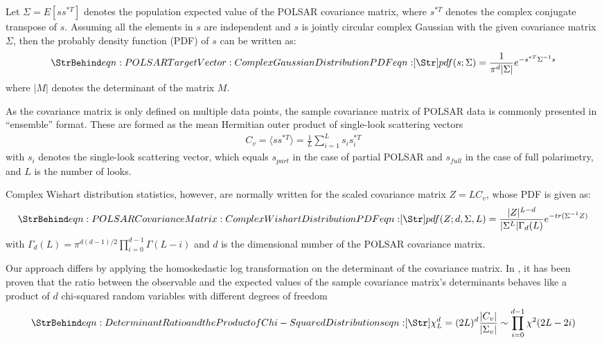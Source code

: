 Let $\Sigma=E [ss^{*T}]$ denotes the population expected value of the POLSAR covariance matrix,
  where $s^{*T}$ denotes the complex conjugate transpose of $s$. 
Assuming all the elements in $s$ are independent
  and $s$ is jointly circular complex Gaussian with the given covariance matrix $\Sigma$,
  then the probably density function (PDF) of $s$ can be written as:
\begin{equation}
  \label{eqn:POLSAR Target Vector: Complex Gaussian Distribution PDF}
  \caption{eqn:POLSAR Target Vector: Complex Gaussian Distribution PDF}
  pdf(s;\Sigma)=\frac{1}{\pi^d|\Sigma|} e^{-s^{*T}\Sigma^{-1}s}
\end{equation}
where $|M|$ denotes the determinant of the matrix $M$.

As the covariance matrix is only defined on multiple data points,
  the sample covariance matrix of POLSAR data is commonly presented in ``ensemble'' format.
These are formed as the mean Hermitian outer product of single-look scattering vectors
\begin{align}
  C_v = \langle ss^{*T} \rangle = \frac{1}{L} \sum^L_{i=1}s_is_i^{*T}
\end{align}
with $s_i$ denotes the single-look scattering vector,
  which equals $s_{part}$ in the case of partial POLSAR and
  $s_{full}$ in the case of full polarimetry,
and $L$ is the number of looks.

Complex Wishart distribution statistics, however, are normally written for the scaled covariance matrix
$Z=LC_v$, whose PDF is given as:
\begin{equation}
  \label{eqn:POLSAR Covariance Matrix: Complex Wishart Distribution PDF}
  \caption{eqn:POLSAR Covariance Matrix: Complex Wishart Distribution PDF}
  pdf(Z;d,\Sigma,L)=\frac{|Z|^{L-d}}{|\Sigma^L|\Gamma_d(L)}e^{-tr(\Sigma^{-1}Z)}
\end{equation}
with $\Gamma_d(L) = \pi^{d(d-1)/2} \prod^{d-1}_{i=0}\Gamma(L-i)$
and $d$ is the dimensional number of the POLSAR covariance matrix.

Our approach differs by applying the homoskedastic log transformation
  on the determinant of the covariance matrix.
In \cite{Goodman_1963_AMS_178}, %
it has been proven that the ratio between the observable and the expected values of the sample covariance matrix's determinants
  behaves like a product of $d$ chi-squared random variables with different degrees of freedom 
\begin{equation}
\label{eqn:prod_chi_squared_rv}  
\caption{eqn:Determinant Ratio and the Product of Chi-Squared Distributions}
\chi^d_L = (2L)^d \frac{|C_v|}{|\Sigma_v|} \sim \prod_{i=0}^{d-1} \chi^2 (2L-2i)
\end{equation}

